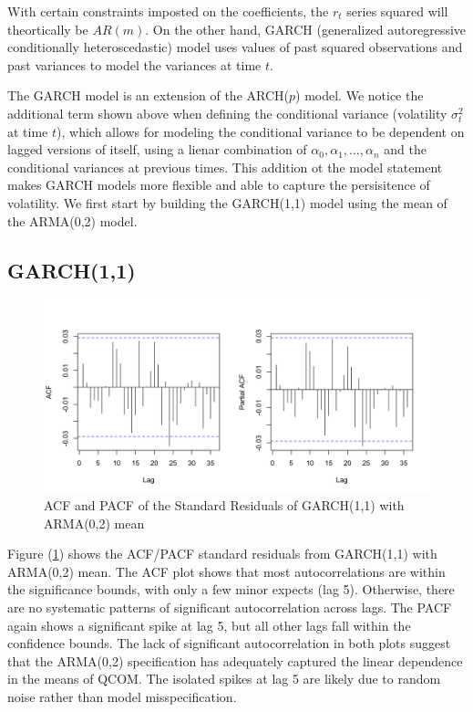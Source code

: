 With certain constraints imposted on the coefficients, the $r_t$ series squared will theortically be $AR(m)$. On the other hand, GARCH (generalized autoregressive conditionally heteroscedastic) model uses values of past squared observations and past variances to model the variances at time $t$. 

The GARCH model is an extension of the ARCH($p$) model. We notice the additional term shown above when defining the conditional variance (volatility $\sigma_t^2$ at time $t$), which allows for modeling the conditional variance to be dependent on lagged versions of itself, using a lienar combination of $\alpha_0,\alpha_1,\ldots,\alpha_n$ and the conditional variances at previous times. This addition ot the model statement makes GARCH models more flexible and able to capture the persisitence of volatility. We first start by building the GARCH(1,1) model using the mean of the ARMA(0,2) model.

\subsection{GARCH(1,1)}

\begin{figure}[!h]
	\centering
	\includegraphics[width=0.85\linewidth]{content/plots/acf_pacf_std_resid.png}
	\caption{ACF and PACF of the Standard Residuals of GARCH(1,1) with ARMA(0,2) mean}
	\label{fig:acf_pacf_std_resid}
\end{figure}


Figure (\ref{fig:acf_pacf_std_resid}) shows the ACF/PACF standard residuals from GARCH(1,1) with ARMA(0,2) mean. The ACF plot shows that most autocorrelations are within the significance bounds, with only a few minor expects (lag 5). Otherwise, there are no systematic patterns of significant autocorrelation across lags. The PACF again shows a significant spike at lag 5, but all other lags fall within the confidence bounds. The lack of significant autocorrelation in both plots suggest that the ARMA(0,2) specification has adequately captured the linear dependence in the means of QCOM. The isolated spikes at lag 5 are likely due to random noise rather than model misspecification.

